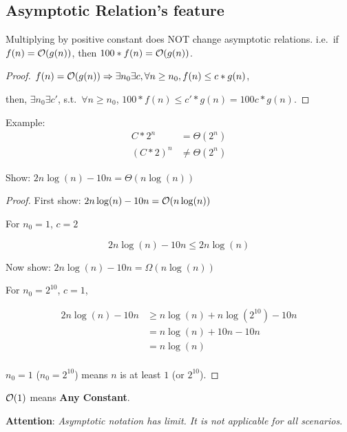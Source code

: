 \subsection{Asymptotic Relation's feature}
\begin{theorem}
Multiplying by positive constant does NOT change asymptotic relations.
i.e.\ if $f(n) = \mathcal{O}(g(n))$, then $100 * f(n) = \mathcal{O}(g(n))$.
\end{theorem}

\begin{proof}
$f(n) = \mathcal{O}(g(n)) \Rightarrow \exists{n_0} \exists c, \forall n \geq n_0, f(n) \leq c*g(n)$,

then, $\exists{n_0}\exists{c'}$, s.t.\ $\forall n \geq n_0$, $100*f(n) \leq c'*g(n) = 100c*g(n)$.
\end{proof}

Example:
\begin{align}
C*2^n & = \Theta(2^n) \\
(C*2)^n & \neq \Theta(2^n)
\end{align}

\begin{claim}
Show: $2n\log(n) - 10n = \Theta(n\log(n))$
\end{claim}

\begin{proof}
First show: $2n\log(n) - 10n = \mathcal{O}(n\log(n))$

For $n_0 = 1$, $c = 2$

\[2n\log(n) - 10n \leq 2n\log(n)\]

Now show: $2n\log(n) - 10n = \Omega(n\log(n))$

For $n_0 = 2^10$, $c = 1$,

\[
\begin{split}
2n\log(n) - 10n & \geq n\log(n) + n \log(2^{10}) - 10n \\
& =n \log(n) + 10n - 10n \\
& =n\log(n) \\
\end{split}
\]

$n_0 = 1$ ($n_0 = 2^{10}$) means $n$ is at least $1$ (or $2^{10}$).
\end{proof}

\begin{corollary}
$\mathcal{O}(1)$ means \textbf{Any Constant}.
\end{corollary}

\textbf{Attention}: \emph{Asymptotic notation has limit. It is not applicable for all scenarios}.

